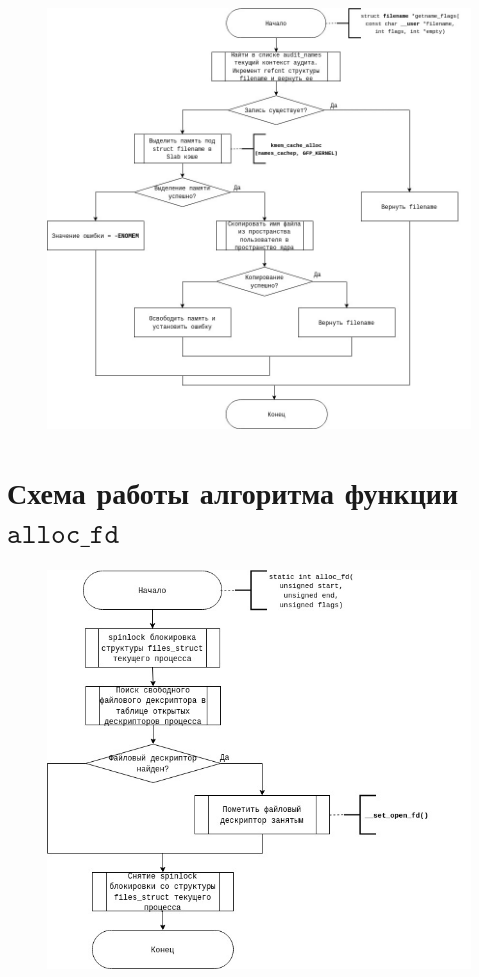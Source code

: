 \documentclass[12pt]{report}
\begin{document}
\begin{figure}[H]
	\centering
	\includegraphics[scale=0.4]{img/getname_flags.jpg}
	\label{fig:get_name_flags}
\end{figure}

\section{Схема работы алгоритма функции $\texttt{alloc\_fd}$}

\begin{figure}[H]
	\centering
	\includegraphics[scale=0.35]{img/alloc_fd.jpg}
	\label{fig:alloc_fd}
\end{figure}
\end{document}
